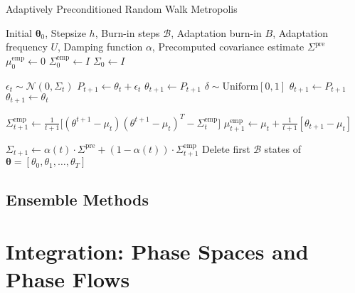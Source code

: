 \documentclass{article}
\begin{document}
    \begin{algorithm}
      \caption{Adaptively Preconditioned Random Walk Metropolis}\label{alg:adaptive_precon_metro}
      \begin{algorithmic}

      \Require Initial $\boldsymbol{\theta}_0$, Stepsize $h$, Burn-in steps $\mathcal{B}$, Adaptation burn-in $B$, Adaptation frequency $U$, Damping function $\alpha$, Precomputed covariance estimate $\Sigma^{\mathrm{pre}}$
      \State $\mu_0^\mathrm{emp} \gets 0$ 
      \State $\Sigma^\mathrm{emp}_0 \gets I$
      \State $\Sigma_0 \gets I$

          \State $\epsilon_t \sim \mathcal{N}(0, \Sigma_t)$ 
          \State $P_{t+1} \gets \theta_t + \epsilon_t$
              \State $\theta_{t+1} \gets P_{t+1}$ 
          \Else
              \State $\delta \sim \mathrm{Uniform}[0, 1]$
                  \State $\theta_{t+1} \gets P_{t+1}$ 
              \Else 
                  \State $\theta_{t+1} \gets \theta_t$
              \EndIf
          \EndIf
          
          \State $\Sigma^\mathrm{emp}_{t+1} \gets \frac{1}{t+1} \big[(\theta^{t+1} - \mu_t) (\theta^{t+1} - \mu_t)^T - \Sigma^\mathrm{emp}_t \big]$
          \State $\mu_{t+1}^\mathrm{emp} \gets \mu_t + \frac{1}{t+1} [ \theta_{t+1} - \mu_t ]$
          
              \State $\Sigma_{t+1} \gets \alpha(t) \cdot \Sigma^\mathrm{pre} + (1 - \alpha(t)) \cdot \Sigma^\mathrm{emp}_{t+1}$
          \EndIf
      \EndFor
      \State Delete first $\mathcal{B}$ states of $\boldsymbol{\theta} = [\theta_0, \theta_1, \ldots, \theta_T]$

      \end{algorithmic}
    \end{algorithm}

  \subsection{Ensemble Methods}

\section{Integration: Phase Spaces and Phase Flows}
\end{document}
